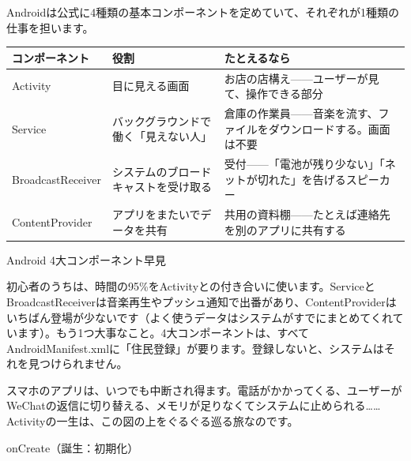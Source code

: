 


Androidは公式に4種類の基本コンポーネントを定めていて、それぞれが1種類の仕事を担います。

\begin{center}
\begin{tabularx}{\linewidth}{|X|X|X|}
\hline
\textbf{コンポーネント} & \textbf{役割} & \textbf{たとえるなら} \tabularnewline
\hline
Activity & 目に見える画面 & お店の店構え——ユーザーが見て、操作できる部分 \tabularnewline
Service & バックグラウンドで働く「見えない人」 & 倉庫の作業員——音楽を流す、ファイルをダウンロードする。画面は不要 \tabularnewline
BroadcastReceiver & システムのブロードキャストを受け取る & 受付——「電池が残り少ない」「ネットが切れた」を告げるスピーカー \tabularnewline
ContentProvider & アプリをまたいでデータを共有 & 共用の資料棚——たとえば連絡先を別のアプリに共有する \tabularnewline
\hline
\end{tabularx}
\end{center}

\begin{center}\small\color{gray}Android 4大コンポーネント早見\end{center}

初心者のうちは、時間の95\%をActivityとの付き合いに使います。ServiceとBroadcastReceiverは音楽再生やプッシュ通知で出番があり、ContentProviderはいちばん登場が少ないです（よく使うデータはシステムがすでにまとめてくれています）。もう1つ大事なこと。4大コンポーネントは、すべてAndroidManifest.xmlに「住民登録」が要ります。登録しないと、システムはそれを見つけられません。


スマホのアプリは、いつでも中断され得ます。電話がかかってくる、ユーザーがWeChatの返信に切り替える、メモリが足りなくてシステムに止められる……Activityの一生は、この図の上をぐるぐる巡る旅なのです。

onCreate（誕生：初期化）

